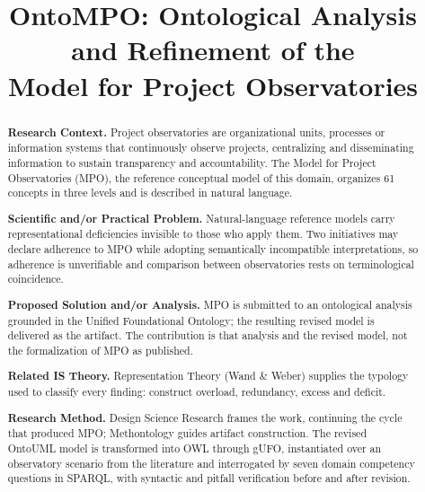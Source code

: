 \documentclass[12pt]{article}
\title{OntoMPO: Ontological Analysis and Refinement of the\\ Model for Project Observatories}
\author{}
\begin{document}
\maketitle

\begin{abstract}
  \textbf{Research Context.} Project observatories are organizational units,
  processes or information systems that continuously observe projects,
  centralizing and disseminating information to sustain transparency and
  accountability. The Model for Project Observatories (MPO), the reference
  conceptual model of this domain, organizes 61 concepts in three levels and is
  described in natural language.

  \textbf{Scientific and/or Practical Problem.} Natural-language reference
  models carry representational deficiencies invisible to those who apply them.
  Two initiatives may declare adherence to MPO while adopting semantically
  incompatible interpretations, so adherence is unverifiable and comparison
  between observatories rests on terminological coincidence.

  \textbf{Proposed Solution and/or Analysis.} MPO is submitted to an
  ontological analysis grounded in the Unified Foundational Ontology; the
  resulting revised model is delivered as the artifact. The contribution is
  that analysis and the revised model, not the formalization of MPO as
  published.

  \textbf{Related IS Theory.} Representation Theory (Wand \& Weber) supplies
  the typology used to classify every finding: construct overload, redundancy,
  excess and deficit.

  \textbf{Research Method.} Design Science Research frames the work, continuing
  the cycle that produced MPO; Methontology guides artifact construction. The
  revised OntoUML model is transformed into OWL through gUFO, instantiated over
  an observatory scenario from the literature and interrogated by seven domain
  competency questions in SPARQL, with syntactic and pitfall verification
  before and after revision.


\end{abstract}
\end{document}
